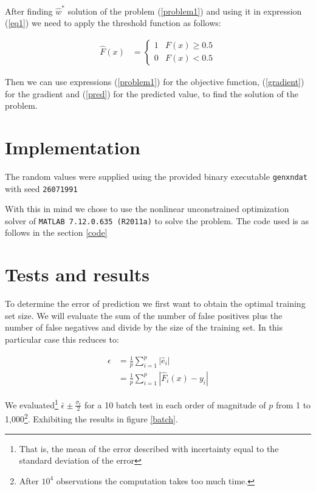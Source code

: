 \documentclass[a4paper,10pt,twocolumn]{article}
\begin{document}
After finding $\hat{w}^*$ solution of the problem (\ref{problem1}) and using it in expression (\ref{eq1}) we need to apply the threshold function as follows: 

\begin{equation}
\begin{aligned}\label{pred}
\hat{F}(x)&=\begin{cases} 
      1 & F(x)\geq 0.5 \\
      0 & F(x) < 0.5 
   \end{cases}
\end{aligned}
\end{equation}

Then we can use expressions (\ref{problem1}) for the objective function, (\ref{gradient}) for the gradient and  (\ref{pred}) for the predicted value, to find the solution of the problem.

 

\section{Implementation}

The random values were supplied using the provided binary executable \texttt{genxndat} with seed \texttt{26071991}


With this in mind we chose to use the nonlinear unconstrained optimization solver of \texttt{MATLAB 7.12.0.635 (R2011a)} to solve the problem. The code used is as follows in the section \ref{code} 

\section{Tests and results}
To determine the error of prediction we first want to obtain the optimal training set size. We will evaluate the sum of the number of false positives plus the number of false negatives and divide by the size of the training set. In this particular case this reduces to:

\begin{equation}
\begin{aligned}
\epsilon&=\frac{1}{p}\sum_{i=1}^p |\hat{e}_i|\\
&=\frac{1}{p}\sum_{i=1}^p|\hat{F}_i(x)-y_i|
\end{aligned}
\end{equation}

We evaluated\footnote{That is, the mean of the error described with incertainty equal to the standard deviation of the error} $\bar{\epsilon}\pm \frac{\sigma_\epsilon}{2}$ for a 10 batch test in each order of magnitude of $p$ from 1 to 1,000\footnote{After $10^4$ observations the computation takes too much time.}. Exhibiting the results in figure \ref{batch}.
\end{document}
